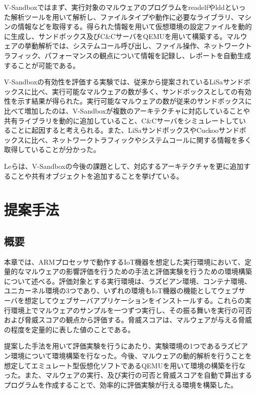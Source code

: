 \documentclass[12pt,a4paper,titlepage,report]{jsbook}
\begin{document}
V-Sandboxではまず、実行対象のマルウェアのプログラムをreadelfやlddといった解析ツールを用いて解析し、ファイルタイプや動作に必要なライブラリ、マシンの情報などを取得する。得られた情報を用いて仮想環境の設定ファイルを動的に生成し、サンドボックス及びC\&CサーバをQEMUを用いて構築する。マルウェアの挙動解析では、システムコール呼び出し、ファイル操作、ネットワークトラフィック、パフォーマンスの観点について情報を記録し、レポートを自動生成することが可能である。

V-Sandboxの有効性を評価する実験では、従来から提案されているLiSaサンドボックスに比べ、実行可能なマルウェアの数が多く、サンドボックスとしての有効性を示す結果が得られた。実行可能なマルウェアの数が従来のサンドボックスに比べて増加したのは、V-Sandboxが複数のアーキテクチャに対応していることや共有ライブラリを動的に追加していること、C\&Cサーバをシミュレートしていることに起因すると考えられる。また、LiSaサンドボックスやCuckooサンドボックスに比べ、ネットワークトラフィックやシステムコールに関する情報を多く取得していることが分かった。

Leらは、V-Sandboxの今後の課題として、対応するアーキテクチャを更に追加することや共有オブジェクトを追加することを挙げている。




\chapter{提案手法}
\section{概要}
本章では、ARMプロセッサで動作するIoT機器を想定した実行環境において、定量的なマルウェアの影響評価を行うための手法と評価実験を行うための環境構築について述べる。評価対象とする実行環境は、ラズビアン環境、コンテナ環境、ユニカーネル環境の3つであり、いずれの環境もIoT機器の機能としてウェブサーバを想定してウェブサーバアプリケーションをインストールする。これらの実行環境上でマルウェアのサンプルを一つずつ実行し、その振る舞いを実行の可否および脅威スコアの観点から評価する。脅威スコアは、マルウェアが与える脅威の程度を定量的に表した値のことである。

提案した手法を用いて評価実験を行うにあたり、実験環境の1つであるラズビアン環境について環境構築を行なった。今後、マルウェアの動的解析を行うことを想定してエミュレート型仮想化ソフトであるQEMUを用いて環境の構築を行なった。また、マルウェアの実行、及び実行の可否と脅威スコアを自動で算出するプログラムを作成することで、効率的に評価実験が行える環境を構築した。
\end{document}

